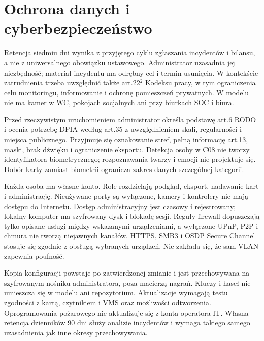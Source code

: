 \section{Ochrona danych i cyberbezpieczeństwo}
Retencja siedmiu dni wynika z przyjętego cyklu zgłaszania incydentów i bilansu, a nie z uniwersalnego obowiązku ustawowego. Administrator uzasadnia jej niezbędność; materiał incydentu ma odrębny cel i termin usunięcia. W kontekście zatrudnienia trzeba uwzględnić także art.22$^2$ Kodeksu pracy, w tym ograniczenia celu monitoringu, informowanie i ochronę pomieszczeń prywatnych. W modelu nie ma kamer w WC, pokojach socjalnych ani przy biurkach SOC i biura.\cite{L-GDPR,L-KP}

Przed rzeczywistym uruchomieniem administrator określa podstawę art.6 RODO i ocenia potrzebę DPIA według art.35 z uwzględnieniem skali, regularności i miejsca publicznego. Przyjmuje się oznakowanie stref, pełną informację art.13, maski, brak dźwięku i ograniczenie eksportu. Detekcja osoby w C08 nie tworzy identyfikatora biometrycznego; rozpoznawania twarzy i emocji nie projektuje się. Dobór karty zamiast biometrii ogranicza zakres danych szczególnej kategorii.\cite{L-GDPR}

Każda osoba ma własne konto. Role rozdzielają podgląd, eksport, nadawanie kart i administrację. Nieużywane porty są wyłączone, kamery i kontrolery nie mają dostępu do Internetu. Dostęp administracyjny jest czasowy i rejestrowany; lokalny komputer ma szyfrowany dysk i blokadę sesji. Reguły firewall dopuszczają tylko opisane usługi między wskazanymi urządzeniami, a wyłączone UPnP, P2P i chmura nie tworzą niejawnych kanałów. HTTPS, SMB3 i OSDP Secure Channel stosuje się zgodnie z obsługą wybranych urządzeń. Nie zakłada się, że sam VLAN zapewnia poufność.\cite{S-VMS,S-KD,S-FW}

Kopia konfiguracji powstaje po zatwierdzonej zmianie i jest przechowywana na szyfrowanym nośniku administratora, poza macierzą nagrań. Kluczy i haseł nie umieszcza się w modelu ani repozytorium. Aktualizacje wymagają testu zgodności z kartą, czytnikiem i VMS oraz możliwości odtworzenia. Oprogramowania pożarowego nie aktualizuje się z konta operatora IT. Własna retencja dzienników 90 dni służy analizie incydentów i wymaga takiego samego uzasadnienia jak inne okresy przechowywania.
